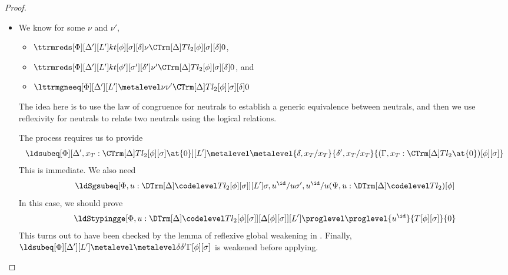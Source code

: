 \begin{proof}
\begin{itemize}[label=Case]
\[    \]
    which further allows us to conclude
    \[
      \ldsubeq[\Phi][\Delta'][L'] \metalevel
      \metalevel{\delta,t[\phi][\sigma][\delta]/x_t}{\delta',\boxit{t''}/x_t}{(\Gamma, x_T : \CTrm[\Delta]T{l_2} \at{0})[\phi][\sigma]}
    \]
    Apply $\lstypeq[\Psi][\Gamma,x_T : \CTrm[\Delta]T{l_2} \at{0}]\metalevel{M}{M'}{l_1}$
    gives us the goal using irrelevance and weak head expansion. %
  \item We know for some $\nu$ and $\nu'$, 
    \begin{itemize}
    \item $\ttrmreds[\Phi][\Delta'][L']
      k{t[\phi][\sigma][\delta]}{\nu}{\CTrm[\Delta]T{l_2}[\phi][\sigma][\delta]}{0}$,
    \item $\ttrmreds[\Phi][\Delta'][L']
      k{t[\phi'][\sigma'][\delta']}{\nu'}{\CTrm[\Delta]T{l_2}[\phi][\sigma][\delta]}{0}$,
      and
    \item $\lttrmgneeq[\Phi][\Delta'][L'] \metalevel \nu{\nu'}{\CTrm[\Delta] T{l_2}[\phi][\sigma][\delta]}{0}$
    \end{itemize}

    The idea here is to use the law of congruence for neutrals to establish a generic
    equivalence between neutrals, and then we use reflexivity for neutrals to relate
    two neutrals using the logical relations. %

    The process requires us to provide
    \[
      \ldsubeq[\Phi][\Delta',x_T : \CTrm[\Delta]T{l_2}[\phi][\sigma]
      \at{0}][L'] \metalevel \metalevel {\delta,x_T/x_T}{\delta',x_T/x_T}{(\Gamma, x_T :
        \CTrm[\Delta]T{l_2} \at{0})[\phi][\sigma]}
    \]
    This is immediate. %
    We also need
    \[
      \ldSgsubeq[\Phi,u : \DTrm[\Delta]\codelevel T {l_2}[\phi][\sigma]][L']{\sigma,u^\id/u}{\sigma',u^\id/u}{(\Psi, u : \DTrm[\Delta]\codelevel T {l_2})[\phi]}
    \]
    In this case, we should prove
    \[
      \ldStypingge[\Phi,u : \DTrm[\Delta]\codelevel T
      {l_2}[\phi][\sigma]][\Delta[\phi][\sigma]][L'] \proglevel
      \proglevel{u^\id}{T[\phi][\sigma]}{0}
    \]
    This turns out to have been checked by the lemma of reflexive global weakening in
    . %
    Finally, $\ldsubeq[\Phi][\Delta'][L'] \metalevel \metalevel \delta{\delta'}{\Gamma[\phi][\sigma]}$
    is weakened before applying. 
  \end{itemize}
\end{proof}

